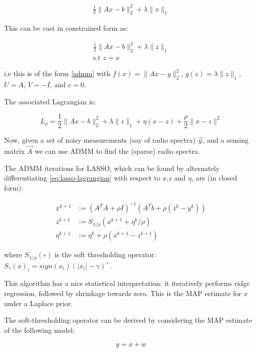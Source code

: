 \documentclass{article}
\begin{document}
\begin{eqnarray}
\frac{1}{2}\|Ax-b\|_2^2 + \lambda\|x\|_1
\end{eqnarray}

This can be cast in constrained form as:

\begin{eqnarray}
\frac{1}{2}\|Ax-b\|_2^2 + \lambda\|z\|_1 \\
\text{s.t } z = x
\end{eqnarray}

i.e this is of the form \eqref{admm} with \( f\left(x\right) =\|Ax-y\|_2^2\), \(g\left(z\right) = \lambda\|z\|_1\), \(U=A\), \(V=-I\), and \(c=0\).

The associated Lagrangian is:

\begin{equation}
L_\rho = \frac{1}{2}\|Ax-b\|_2^2 + \lambda\|z\|_1 + \eta\left(x-z\right) + \frac{\rho}{2}\|x-z\|^2
\label{eq:lasso-lagrangian}
\end{equation}

Now, given a set of noisy measurements (say of radio spectra) \(\vec{y}\), and a sensing matrix \(\vec{A}\) we can use ADMM to find the (sparse) radio spectra.

The ADMM iterations for LASSO, which can be found by alternately differentiating \eqref{eq:lasso-lagrangian} with respect to \(x\),\(z\) and \(\eta\), are (in closed form):

\begin{align}
x^{k+1} &:= \left(A^TA + \rho I\right)^{-1}\left(A^Tb +\rho\left(z^k - y^k\right)\right)\\
z^{k+1} &:= S_{\lambda/\rho}\left(x^{k+1} + \eta^k/\rho\right)
 \\
\eta^{k+1} &:= \eta^{k} + \rho \left(x^{k+1}-z^{k+1}\right)
\label{admm_algo_lasso}
\end{align}

where \(S_{\lambda/\rho}\left(\circ\right)\) is the soft thresholding operator: \(S_\gamma\left(x\right)_i = sign(x_i)\left(|x_i| - \gamma\right)^+\).

This algorithm has a nice statistical interpretation: it iteratively performs ridge regression, followed by shrinkage towards zero. This is the MAP estimate for \(x\) under a Laplace prior.

The soft-thresholding operator can be derived by considering the MAP estimate of the following model:

\begin{equation}
y = x + w
\end{equation}
\end{document}
